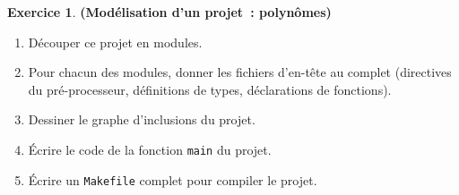 \documentclass[12pt]{article}
\theoremstyle{definition}
\newtheorem{Exercice}{Exercice}
\newcommand{\Sol}[1]{}
\begin{document}
\begin{Exercice} {\bf (Modélisation d'un projet~: polynômes)}
    \begin{enumerate}
        \item Découper ce projet en modules.
        \smallskip

        \item Pour chacun des modules, donner les fichiers d'en-tête
        au complet (directives du pré-processeur, définitions de types,
        déclarations de fonctions).
        \smallskip

        \item Dessiner le graphe d'inclusions du projet.
        \smallskip

        \item Écrire le code de la fonction {\tt main} du projet.
        \smallskip

        \item Écrire un {\tt Makefile} complet pour compiler le projet.
    \end{enumerate}

    \Sol{
    Rien n'est imposé mais je pense que le découpage suivant est adéquat~:
    \begin{itemize}
        \item un module pour gérer des listes de {\tt double} (pour
        représenter les polynômes)~;
        \item un module pour gérer les polynômes~;
        \item un module pour gérer l'affichage du graphe~;
        \item un module pour l'analyseur syntaxique qui permet de lire
        un polynôme depuis un fichier.
    \end{itemize}
    Ensuite, le reste est sans pièges.
    }
\end{Exercice}
\bigskip
\end{document}
